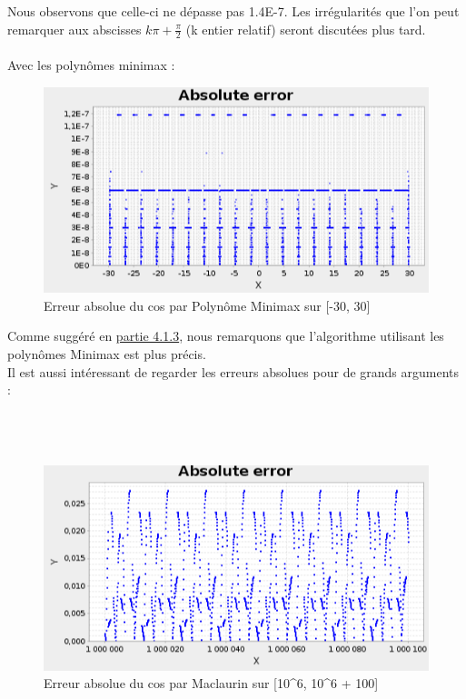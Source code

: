 \documentclass[12pt]{article}
\begin{document}
\noindent Nous observons que celle-ci ne dépasse pas 1.4E-7. Les irrégularités que l'on peut remarquer aux abscisses
$k\pi+\frac{\pi}{2}$ (k entier relatif) seront discutées plus tard. \\ \\Avec les polynômes minimax :

\begin{figure}[ht]
    \begin{center}
      \includegraphics[scale=0.28]{ErrorAbsCosMini.png}
      \caption{Erreur absolue du cos par Polynôme Minimax sur [-30, 30]}
      \label{Erreur absolue du cos par Polynôme Minimax sur [-30, 30] avec 100 000 points}
    \end{center}
\end{figure}

Comme suggéré en \hyperref[sec:minimax]{partie 4.1.3}, nous remarquons que l'algorithme utilisant les polynômes Minimax est plus précis.\\
Il est aussi intéressant de regarder les erreurs absolues pour de grands arguments : \\ \\ \\ \\

\begin{figure}[ht]
    \begin{center}
      \includegraphics[scale=0.32]{ErrorAbsCosMiniFar.png}
      \caption{Erreur absolue du cos par Maclaurin sur [10^6, 10^6 + 100]}
      \label{Erreur absolue du cos par série Maclaurin sur $[10^6, 10^6 + 100]$}
    \end{center}
\end{figure}
\end{document}
